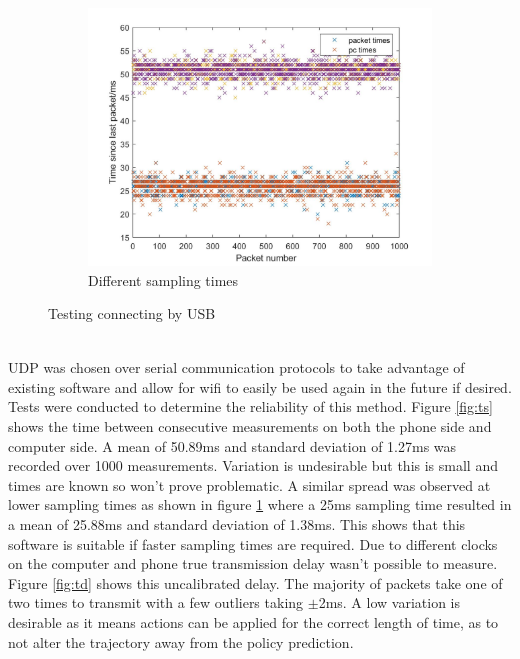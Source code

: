 \documentclass[twoside,twocolumn,12pt]{article}
\begin{document}
\begin{figure}[t]
\begin{subfigure}[t]{0.325\textwidth}
    \includegraphics[width=\linewidth]{both}
    \caption{Different sampling times}
  \label{fig:ts2}
  \end{subfigure}
  \caption{Testing connecting by USB}
  \label{fig:usb}
\end{figure}

\begin{align*}
[t, a_x, a_y ,a_z , \dot{\alpha}_x, \dot{\alpha}_y , \dot{\alpha}_z \#]
\end{align*}

UDP was chosen over serial communication protocols to take advantage of existing software and allow for wifi to easily be used again in the future if desired.
\newline
Tests were conducted to determine the reliability of this method. Figure \ref{fig:ts} shows the time between consecutive measurements on both the phone side and computer side. A mean of 50.89ms and standard deviation of 1.27ms was recorded over 1000 measurements. Variation is undesirable but this is small and times are known so won't prove problematic. A similar spread was observed at lower sampling times as shown in figure \ref{fig:ts2} where a 25ms sampling time resulted in a mean of 25.88ms and standard deviation of 1.38ms. This shows that this software is suitable if faster sampling times are required.
\newline
Due to different clocks on the computer and phone true transmission delay wasn't possible to measure. Figure \ref{fig:td} shows this uncalibrated delay. The majority of packets take one of two times to transmit with a few outliers taking $\pm$2ms. A low variation is desirable as it means actions can be applied for the correct length of time, as to not alter the trajectory away from the policy prediction.
\end{document}

